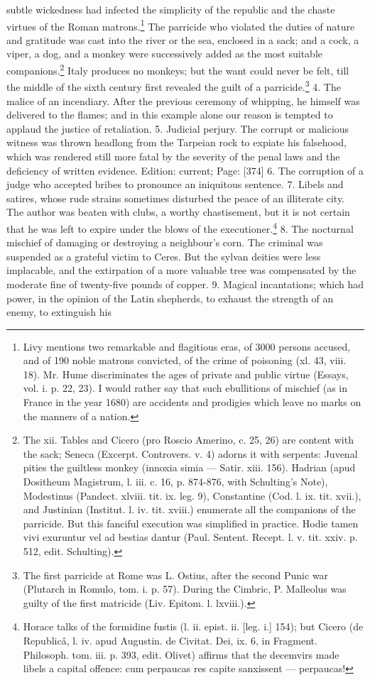 subtle wickedness had infected the simplicity of the republic and the chaste virtues of the Roman matrons.\footnote{Livy mentions two remarkable and flagitious eras, of 3000 persons accused, and of 190 noble matrons convicted, of the crime of poisoning (xl. 43, viii. 18). Mr. Hume discriminates the ages of private and public virtue (Essays, vol. i. p. 22, 23). I would rather say that such ebullitions of mischief (as in France in the year 1680) are accidents and prodigies which leave no marks on the manners of a nation.} The parricide who violated the duties of nature and gratitude was cast into the river or the sea, enclosed in a sack; and a cock, a viper, a dog, and a monkey were successively added as the most suitable companions.\footnote{The xii. Tables and Cicero (pro Roscio Amerino, c. 25, 26) are content with the sack; Seneca (Excerpt. Controvers. v. 4) adorns it with serpents: Juvenal pities the guiltless monkey (innoxia simia \texthebrew{—} Satir. xiii. 156). Hadrian (apud Dositheum Magistrum, l. iii. c. 16, p. 874-876, with Schulting\texthebrew{}’s Note), Modestinus (Pandect. xlviii. tit. ix. leg. 9), Constantine (Cod. l. ix. tit. xvii.), and Justinian (Institut. l. iv. tit. xviii.) enumerate all the companions of the parricide. But this fanciful execution was simplified in practice. Hodie tamen vivi exuruntur vel ad bestias dantur (Paul. Sentent. Recept. l. v. tit. xxiv. p. 512, edit. Schulting).} Italy produces no monkeys; but the want could never be felt, till the middle of the sixth century first revealed the guilt of a parricide.\footnote{The first parricide at Rome was L. Ostius, after the second Punic war (Plutarch in Romulo, tom. i. p. 57). During the Cimbric, P. Malleolus was guilty of the first matricide (Liv. Epitom. l. lxviii.).} 4. The malice of an incendiary. After the previous ceremony of whipping, he himself was delivered to the flames; and in this example alone our reason is tempted to applaud the justice of retaliation. 5. Judicial perjury. The corrupt or malicious witness was thrown headlong from the Tarpeian rock to expiate his falsehood, which was rendered still more fatal by the severity of the penal laws and the deficiency of written evidence. Edition: current; Page: [374] 6. The corruption of a judge who accepted bribes to pronounce an iniquitous sentence. 7. Libels and satires, whose rude strains sometimes disturbed the peace of an illiterate city. The author was beaten with clubs, a worthy chastisement, but it is not certain that he was left to expire under the blows of the executioner.\footnote{Horace talks of the formidine fustis (l. ii. epist. ii. [leg. i.] 154); but Cicero (de Republicâ, l. iv. apud Augustin. de Civitat. Dei, ix. 6, in Fragment. Philosoph. tom. iii. p. 393, edit. Olivet) affirms that the decemvirs made libels a capital offence: cum perpaucas res capite sanxissent \texthebrew{—} perpaucas!} 8. The nocturnal mischief of damaging or destroying a neighbour\texthebrew{}’s corn. The criminal was suspended as a grateful victim to Ceres. But the sylvan deities were less implacable, and the extirpation of a more valuable tree was compensated by the moderate fine of twenty-five pounds of copper. 9. Magical incantations; which had power, in the opinion of the Latin shepherds, to exhaust the strength of an enemy, to extinguish his 